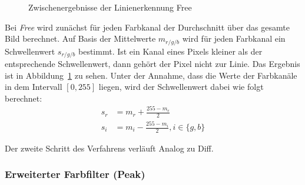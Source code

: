 \documentclass[ngerman,a4paper,parskip=half]{scrartcl}
\begin{document}
\begin{figure}[H]
	\caption{Zwischenergebnisse der Linienerkennung Free}
	\label{fig:free}
\end{figure}

Bei \emph{Free} wird zunächst für jeden Farbkanal der Durchschnitt über das gesamte Bild berechnet.
Auf Basis der Mittelwerte $m_{r/g/b}$ wird für jeden Farbkanal ein Schwellenwert $s_{r/g/b}$ bestimmt. Ist ein Kanal eines Pixels kleiner als der entsprechende Schwellenwert, dann gehört der Pixel nicht zur Linie. Das Ergebnis ist in Abbildung~\ref{fig:free} zu sehen.
Unter der Annahme, dass die Werte der Farbkanäle in dem Intervall $[0,255]$ liegen, wird der Schwellenwert dabei wie folgt berechnet:
\begin{align*}
	s_r &= m_r + \frac{255 - m_r}{2}\\
	s_i &= m_i - \frac{255 - m_i}{2}, i \in \{g,b\}
\end{align*}

Der zweite Schritt des Verfahrens verläuft Analog zu Diff.

\subsubsection{Erweiterter Farbfilter (Peak)}
\end{document}
